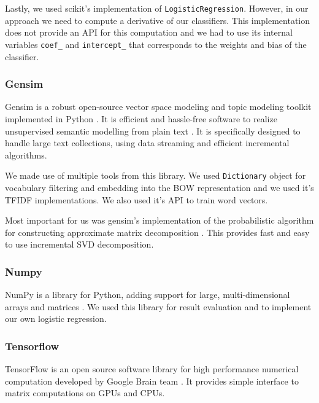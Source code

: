         Lastly, we used scikit's implementation of \texttt{LogisticRegression}.
        However, in our approach we need to compute a derivative of our classifiers. 
        This implementation does not provide an API for this computation and we had to use
        its internal variables \texttt{coef\_} and \texttt{intercept\_} that corresponds to the weights and bias of the classifier.
        
        
        \subsubsection{Gensim}
        
        Gensim is a robust open-source vector space modeling and topic modeling toolkit implemented in Python \cite{rehurek_lrec}. 
        It is efficient and hassle-free software to realize unsupervised semantic modelling from plain text \cite{bird2009natural}. %
        It is specifically designed to handle large text collections, using data streaming and efficient incremental algorithms. 
        
        We made use of multiple tools from this library. 
        We used \texttt{Dictionary} object for vocabulary filtering and embedding into the BOW representation and we used it's TFIDF implementations.
        We also used it's API to train word vectors. 
        
        Most important for us was gensim's implementation of the probabilistic algorithm for constructing approximate matrix decomposition \cite{halko2011finding}.
        This provides fast and easy to use incremental SVD decomposition.
        
        \subsubsection{Numpy}
        NumPy is a library for Python, adding support for large, multi-dimensional arrays and matrices \cite{oliphant2006guide}. %
        We used this library for result evaluation and to implement our own logistic regression.
        
        \subsubsection{Tensorflow}
        
        TensorFlow is an open source software library for high performance numerical computation developed by Google Brain team \cite{tensorflow2015-whitepaper}. 
        It provides simple interface to matrix computations on GPUs and CPUs.
        
